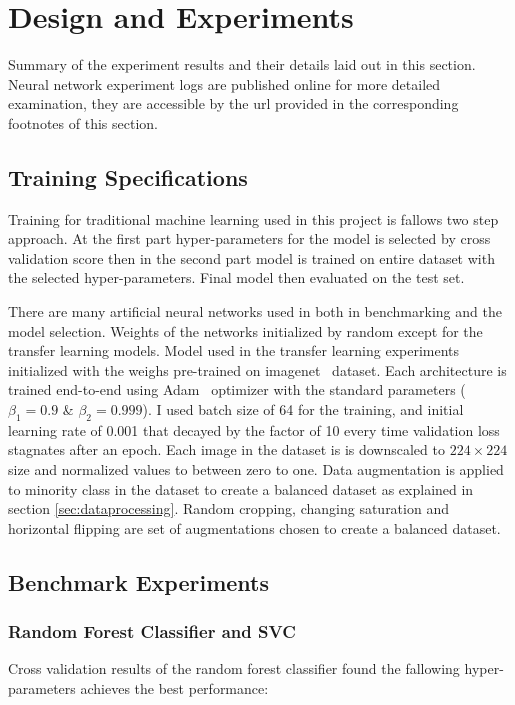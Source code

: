 \chapter{Design and Experiments}
Summary of the experiment results and their details laid out in this section.
Neural network experiment logs are published online for more detailed examination, they are accessible by the url provided in the corresponding footnotes of this section.

\section{Training Specifications}
Training for traditional machine learning used in this project is fallows two step approach.
At the first part hyper-parameters for the model is selected by cross validation score then in the second part model is trained on entire dataset with the selected hyper-parameters.
Final model then evaluated on the test set.

There are many artificial neural networks used in both in benchmarking and the model selection.
Weights of the networks initialized by random except for the transfer learning models.
Model used in the transfer learning experiments initialized with the weighs pre-trained on imagenet~\cite{imagenet} dataset.
Each architecture is trained end-to-end using Adam~\cite{adam} optimizer with the standard parameters ($\beta_1 = 0.9$ \& $\beta_2 = 0.999$).
I used batch size of 64 for the training, and initial learning rate of 0.001 that decayed by the factor of 10 every time validation loss stagnates after an epoch.
Each image in the dataset is is downscaled to $224 \times 224$ size and normalized values to between zero to one.
Data augmentation is applied to minority class in the dataset to create a balanced dataset as explained in section \ref{sec:dataprocessing}.
Random cropping, changing saturation and horizontal flipping are set of augmentations chosen to create a balanced dataset.


\section{Benchmark Experiments}

\subsection{Random Forest Classifier and SVC}
Cross validation results of the random forest classifier found the fallowing hyper-parameters achieves the best performance:

